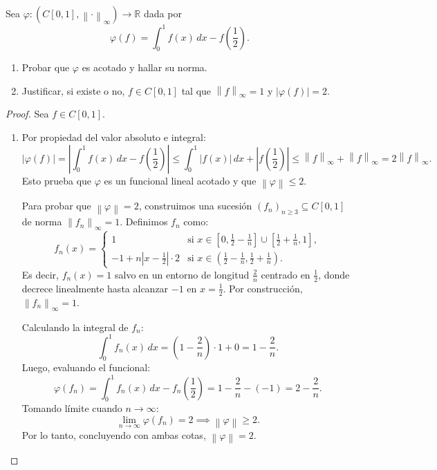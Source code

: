 \documentclass{article}
\theoremstyle{definition}
\newcommand{\R}{\mathbb{R}}
\newcommand{\norm}[1]{\left\lVert #1 \right\rVert}       %
\newenvironment{ejercicio}[1]{\begin{trivlist}
\item[\hskip \labelsep {\bfseries Ejercicio}\hskip \labelsep {\bfseries #1.}]}{\end{trivlist}}
\begin{document}
\clearpage

\begin{ejercicio}{4}
    Sea \( \varphi:(C[0,1],\norm{\cdot}_\infty)\to\R \) dada por
    \[
        \varphi(f)=\int_0^1 f(x)\,dx - f\left(\frac12\right).
    \]
    \begin{enumerate}
        \item Probar que \( \varphi \) es acotado y hallar su norma.
        \item Justificar, si existe o no, \(f\in C[0,1]\) tal que \(\norm{f}_\infty=1\) y \(|\varphi(f)|=2\).
    \end{enumerate}
\end{ejercicio}
\begin{proof}
    Sea \(f \in C[0,1]\).
    \begin{enumerate}
        \item Por propiedad del valor absoluto e integral:
              \[
                  |\varphi(f)| = \left| \int_0^1 f(x) \, dx - f\left(\frac12\right) \right| \leq \int_0^1 |f(x)| \, dx + \left| f\left(\frac12\right) \right| \leq \norm{f}_\infty + \norm{f}_\infty = 2 \norm{f}_\infty.
              \]
              Esto prueba que \( \varphi \) es un funcional lineal acotado y que \(\norm{\varphi} \leq 2\).

              Para probar que \(\norm{\varphi} = 2\), construimos una sucesión \( {(f_n)}_{n \geq 3} \subseteq C[0,1]\) de norma \(\norm{f_n}_\infty = 1\). Definimos \(f_n\) como:
              \[
                  f_n(x) = \begin{cases}
                      1                                           & \text{si } x \in \left[0, \frac{1}{2} - \frac{1}{n}\right] \cup \left[\frac{1}{2} + \frac{1}{n}, 1\right], \\[1ex]
                      -1 + n \left|x - \frac{1}{2}\right| \cdot 2 & \text{si } x \in \left(\frac{1}{2} - \frac{1}{n}, \frac{1}{2} + \frac{1}{n}\right).
                  \end{cases}
              \]
              Es decir, \(f_n(x) = 1\) salvo en un entorno de longitud \(\frac{2}{n}\) centrado en \(\frac{1}{2}\), donde decrece linealmente hasta alcanzar \(-1\) en \(x = \frac{1}{2}\). Por construcción, \(\norm{f_n}_\infty = 1\).

              Calculando la integral de \(f_n\):
              \[
                  \int_0^1 f_n(x) \, dx = \left(1 - \frac{2}{n}\right) \cdot 1 + 0 = 1 - \frac{2}{n}.
              \]
              Luego, evaluando el funcional:
              \[
                  \varphi(f_n) = \int_0^1 f_n(x) \, dx - f_n\left(\frac{1}{2}\right) = 1 - \frac{2}{n} - (-1) = 2 - \frac{2}{n}.
              \]
              Tomando límite cuando \( n \to \infty \):
              \[
                  \lim_{n \to \infty} \varphi(f_n) = 2 \implies \norm{\varphi} \geq 2.
              \]
              Por lo tanto, concluyendo con ambas cotas, \(\norm{\varphi} = 2\).


\end{enumerate}
\end{proof}
\end{document}
